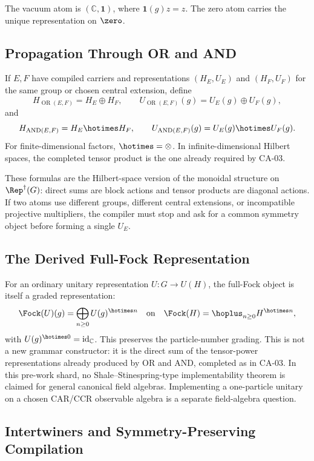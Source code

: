 The vacuum atom is \((\mathbb C,\mathbf 1)\), where \(\mathbf 1(g)z=z\).  The
zero atom carries the unique representation on \(\zero\).

\subsection{Propagation Through OR and AND}

If \(E,F\) have compiled carriers and representations \((H_E,U_E)\) and
\((H_F,U_F)\) for the same group or chosen central extension, define
\[
  H_{\operatorname{OR}(E,F)}=H_E\oplus H_F,\qquad
  U_{\operatorname{OR}(E,F)}(g)=U_E(g)\oplus U_F(g),
\]
and
\[
  H_{\operatorname{AND}(E,F)}=H_E\hotimes H_F,\qquad
  U_{\operatorname{AND}(E,F)}(g)=U_E(g)\hotimes U_F(g).
\]
For finite-dimensional factors, \(\hotimes=\otimes\).  In infinite-dimensional
Hilbert spaces, the completed tensor product is the one already required by
CA-03.

These formulas are the Hilbert-space version of the monoidal structure on
\(\Rep^\dagger(G)\): direct sums are block actions and tensor products are
diagonal actions.  If two atoms use different groups, different central
extensions, or incompatible projective multipliers, the compiler must stop and
ask for a common symmetry object before forming a single \(U_E\).

\subsection{The Derived Full-Fock Representation}

For an ordinary unitary representation \(U:G\to U(H)\), the full-Fock object is
itself a graded representation:
\[
  \Fock(U)(g)
  =
  \bigoplus_{n\ge0} U(g)^{\hotimes n}
  \quad\text{on}\quad
  \Fock(H)=\hoplus_{n\ge0}H^{\hotimes n},
\]
with \(U(g)^{\hotimes0}=\operatorname{id}_{\mathbb C}\).  This preserves the
particle-number grading.  This is not a new grammar constructor: it is the
direct sum of the tensor-power representations already produced by OR and AND,
completed as in CA-03.  In this pre-work shard, no Shale--Stinespring-type
implementability theorem is claimed for general canonical field algebras.
Implementing a one-particle unitary on a chosen CAR/CCR observable algebra is a
separate field-algebra question.

\subsection{Intertwiners and Symmetry-Preserving Compilation}

